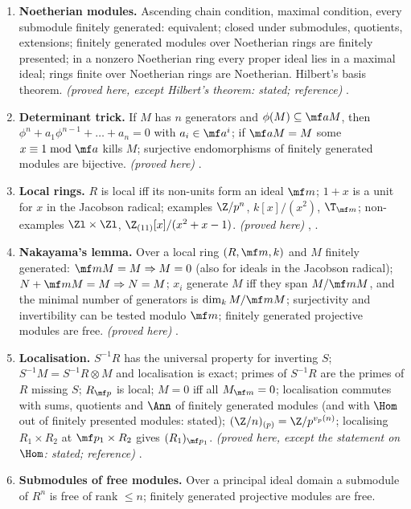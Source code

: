 \begin{enumerate}[label=\textbf{\thechapter.\arabic*}]
extensions of principal ideal domains. \emph{(proved here)} .
\item \textbf{Noetherian modules.} Ascending chain condition, maximal condition, every submodule finitely generated: equivalent; closed under submodules,
quotients, extensions; finitely generated modules over Noetherian rings are finitely presented; in a nonzero Noetherian ring every proper ideal lies in a
maximal ideal; rings finite over Noetherian rings are Noetherian. Hilbert's basis theorem. \emph{(proved here, except Hilbert's theorem: stated; reference)}
.
\item \textbf{Determinant trick.} If $M$ has $n$ generators and $\phi(M)\subseteq\mf aM$, then $\phi^n+a_1\phi^{n-1}+\dots+a_n=0$ with $a_i\in\mf a^i$; if $\mf aM=M$ some $x\equiv1\bmod\mf a$
kills $M$; surjective endomorphisms of finitely generated modules are bijective. \emph{(proved here)} .
\item \textbf{Local rings.} $R$ is local iff its non-units form an ideal $\mf m$; $1+x$ is a unit for $x$ in the Jacobson radical; examples $\Z/p^n$, $k[x]/(x^2)$, $\T_{\mf m}$;
non-examples $\Zl\times\Zl$, $\Z_{(11)}[x]/(x^2+x-1)$. \emph{(proved here)} , .
\item \textbf{Nakayama's lemma.} Over a local ring $(R,\mf m,k)$ and $M$ finitely generated: $\mf mM=M\Rightarrow M=0$ (also for ideals in the Jacobson radical); $N+\mf mM=M\Rightarrow N=M$;
$x_i$ generate $M$ iff they span $M/\mf mM$, and the minimal number of generators is $\dim_kM/\mf mM$; surjectivity and invertibility can be tested modulo $\mf m$;
finitely generated projective modules are free. \emph{(proved here)} .
\item \textbf{Localisation.} $S^{-1}R$ has the universal property for inverting $S$; $S^{-1}M=S^{-1}R\otimes M$ and localisation is exact; primes of $S^{-1}R$ are the primes
of $R$ missing $S$; $R_{\mf p}$ is local; $M=0$ iff all $M_{\mf m}=0$; localisation commutes with sums, quotients and $\Ann$ of finitely generated modules (and with $\Hom$
out of finitely presented modules: stated); $(\Z/n)_{(p)}=\Z/p^{v_p(n)}$; localising $R_1\times R_2$ at $\mf p_1\times R_2$ gives $(R_1)_{\mf p_1}$. \emph{(proved here, except the
statement on $\Hom$: stated; reference)} .
\item \textbf{Submodules of free modules.} Over a principal ideal domain a submodule of $R^n$ is free of rank $\le n$; finitely generated projective modules are free.

\end{enumerate}

